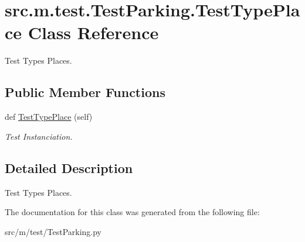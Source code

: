 \hypertarget{classsrc_1_1m_1_1test_1_1_test_parking_1_1_test_type_place}{}\section{src.\+m.\+test.\+Test\+Parking.\+Test\+Type\+Place Class Reference}
\label{classsrc_1_1m_1_1test_1_1_test_parking_1_1_test_type_place}


Test Types Places.  


\subsection*{Public Member Functions}
\begin{DoxyCompactItemize}
\item 
\hypertarget{classsrc_1_1m_1_1test_1_1_test_parking_1_1_test_type_place_abe279fc78cd7c51221bbd1dfe095f317}{}def \hyperlink{classsrc_1_1m_1_1test_1_1_test_parking_1_1_test_type_place_abe279fc78cd7c51221bbd1dfe095f317}{Test\+Type\+Place} (self)\label{classsrc_1_1m_1_1test_1_1_test_parking_1_1_test_type_place_abe279fc78cd7c51221bbd1dfe095f317}

\begin{DoxyCompactList}\small\item\em Test Instanciation. \end{DoxyCompactList}\end{DoxyCompactItemize}


\subsection{Detailed Description}
Test Types Places. 

The documentation for this class was generated from the following file\+:\begin{DoxyCompactItemize}
\item 
src/m/test/Test\+Parking.\+py\end{DoxyCompactItemize}
